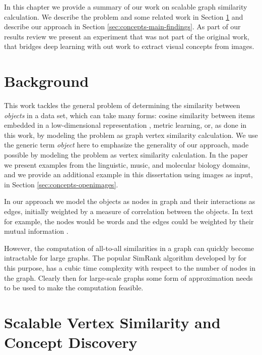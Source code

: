 In this chapter we provide a summary of our work on scalable graph similarity calculation.
We describe the problem and some related work in Section \ref{sec:concepts-background}
and describe our approach in Section \ref{sec:concepts-main-findings}. As part of our
results review we present an experiment that was not part of the original work, that
bridges deep learning with out work to extract visual concepts from images.


\section{Background}

\label{sec:concepts-background}

This work tackles the general problem of determining the similarity between \emph{objects}
in a data set, which can take many forms: cosine similarity between
items embedded in a low-dimensional representation \cite{word2vec}, metric learning\cite{metric-learning-survey}, or, as done
in this work, by modeling the problem as graph vertex similarity calculation.
We use the generic term \emph{object} here to emphasize the generality of our
approach, made possible by modeling the problem as vertex similarity calculation. In the paper we present examples from the linguistic,
music, and molecular biology domains, and we provide an additional example in this dissertation
using images as input, in Section \ref{sec:concepts-openimages}.

In our approach we model the objects as nodes in graph and their interactions as edges,
initially weighted by a measure of correlation between the objects. In text for example, the
nodes would be words and the edges could be weighted by their mutual information \cite{mutual-information-nlp}.

However, the computation of all-to-all similarities in a graph can quickly become
intractable for large graphs. The popular SimRank algorithm developed by
\citet{simrank} for this purpose,
has a cubic time complexity with respect to the number of nodes in the graph.
Clearly then for large-scale graphs some form of approximation needs to be used
to make the computation feasible.


\section{Scalable Vertex Similarity and Concept Discovery}

